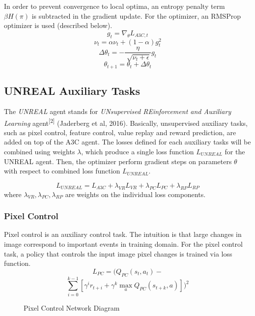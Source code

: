 \documentclass[12pt,twocolumn,letterpaper]{article}
\begin{document}
In order to prevent convergence to local optima, an entropy penalty term $\beta H(\pi)$ is subtracted in the gradient update. For the optimizer, an RMSProp optimizer is used (described below).
$$ g_t = \nabla_\theta L_{A3C, t} $$
$$ \nu_t = \alpha \nu_t + (1-\alpha) g_t^2 $$
$$ \Delta \theta_t = - \frac{\eta}{\sqrt[]{\nu_t + \epsilon}} g_t$$
$$ \theta_{t+1} = \theta_t + \Delta \theta_t $$




\subsection{UNREAL Auxiliary Tasks}
The \textit{UNREAL} agent stands for \textit{UNsupervised REinforcement and Auxiliary Learning} agent\textsuperscript{[2]} (Jaderberg et al, 2016). Basically, unsupervised auxiliary tasks, such as pixel control, feature control, value replay and reward prediction, are added on top of the A3C agent. The losses defined for each auxiliary tasks will be combined using weights $\lambda$, which produce a single loss function $L_{UNREAL}$ for the UNREAL agent. Then, the optimizer perform gradient steps on parameters $\theta$ with respect to combined loss function $L_{UNREAL}$. 

$$ L_{UNREAL} = L_{A3C} + \lambda_{VR} L_{VR} + \lambda_{PC} L_{PC} + \lambda_{RP} L_{RP} $$
where $\lambda_{VR}, \lambda_{PC}, \lambda_{RP}$ are weights on the individual loss components.

\subsubsection{Pixel Control}
Pixel control is an auxiliary control task. The intuition is that large changes in image correspond to important events in training domain. For the pixel control task, a policy that controls the input image pixel changes is trained via loss function.
$$ L_{PC} = (Q_{PC}(s_t, a_t) - $$
$$ \sum_{i = 0}^{k-1}[\gamma^i r_{t+i} + \gamma^k \max_{a}Q_{PC}(s_{t+k}, a)])^2$$ 

\begin{figure}[H]
\begin{center}
\end{center}
   \caption{Pixel Control Network Diagram}
\label{fig:long}
\label{fig:onecol}
\end{figure}
\end{document}
